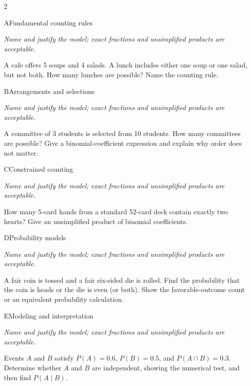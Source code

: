 \documentclass[9pt]{extarticle}
\begin{document}
\begin{multicols}{2}
\begin{CoreProblem}{A}{Fundamental counting rules}
{\scriptsize\textit{Name and justify the model; exact fractions and unsimplified products are acceptable.}\par}
A cafe offers 5 soups and 4 salads. A lunch includes either one soup
    or one salad, but not both. How many lunches are possible? Name the counting
    rule.
\end{CoreProblem}
\begin{CoreProblem}{B}{Arrangements and selections}
{\scriptsize\textit{Name and justify the model; exact fractions and unsimplified products are acceptable.}\par}
A committee of 3 students is selected from 10 students. How many
    committees are possible? Give a binomial-coefficient expression and explain
    why order does not matter.
\end{CoreProblem}
\begin{CoreProblem}{C}{Constrained counting}
{\scriptsize\textit{Name and justify the model; exact fractions and unsimplified products are acceptable.}\par}
How many 5-card hands from a standard 52-card deck contain exactly
    two hearts? Give an unsimplified product of binomial coefficients.
\end{CoreProblem}
\columnbreak
\begin{CoreProblem}{D}{Probability models}
{\scriptsize\textit{Name and justify the model; exact fractions and unsimplified products are acceptable.}\par}
A fair coin is tossed and a fair six-sided die is rolled. Find the
    probability that the coin is heads or the die is even (or both). Show the
    favorable-outcome count or an equivalent probability calculation.
\end{CoreProblem}
\begin{CoreProblem}{E}{Modeling and interpretation}
{\scriptsize\textit{Name and justify the model; exact fractions and unsimplified products are acceptable.}\par}
Events $A$ and $B$ satisfy $P(A)=0.6$, $P(B)=0.5$, and
    $P(A\cap B)=0.3$. Determine whether $A$ and $B$ are independent, showing
    the numerical test, and then find $P(A\mid B)$.
\end{CoreProblem}
\end{multicols}
\CoreWorkArea
\FormBreak
{}
\end{document}
